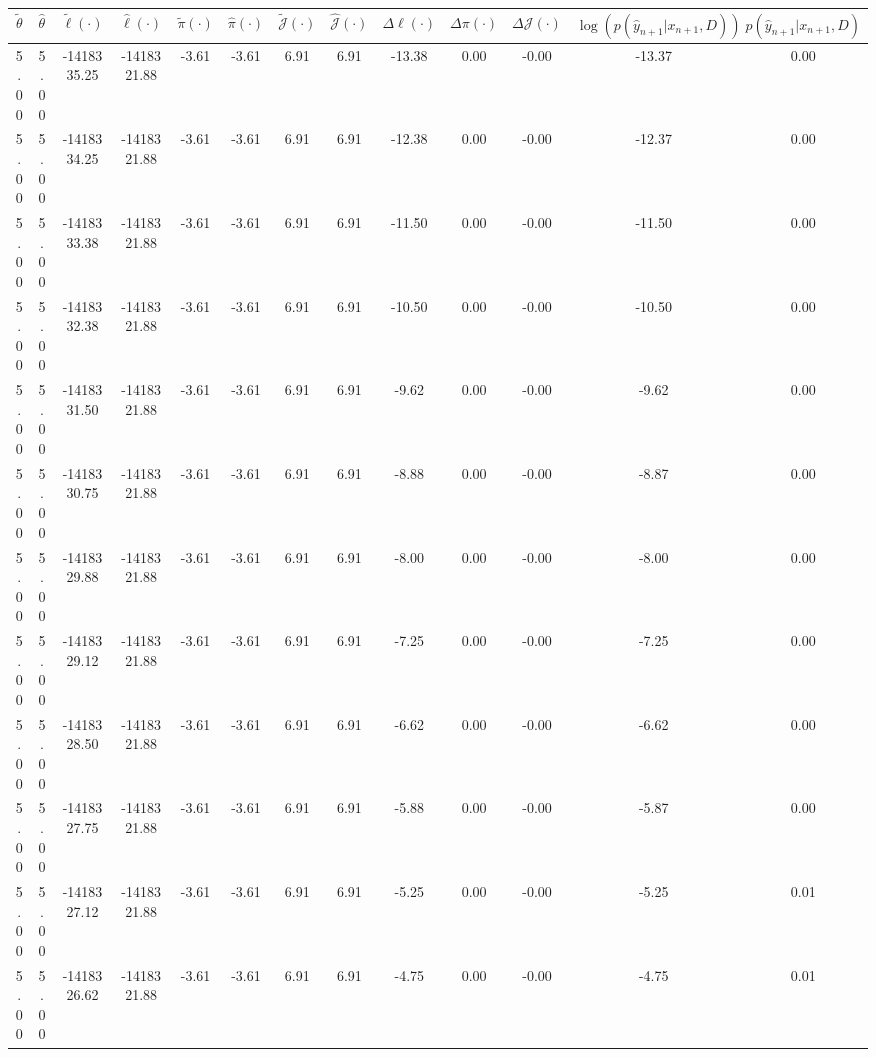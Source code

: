 \begin{table}[htbp]
        \centering
        \tiny
        \begin{adjustbox}{angle=90}
            \begin{tabular}{|c|c|c|c|c|c|c|c|c|c|c|c|c|}
                \hline
                 $\tilde{\theta}$ & $\hat{\theta}$ & $\tilde{\ell}(\cdot)$ & $\hat{\ell}(\cdot)$ & $\tilde{\pi}(\cdot)$ & $\hat{\pi}(\cdot)$ & $\tilde{\mathcal{J}}(\cdot)$ & $\hat{\mathcal{J}}(\cdot)$ & $\Delta \ell(\cdot)$ & $\Delta \pi(\cdot)$ & $\Delta \mathcal{J}(\cdot)$ & $\log(p(\hat{y}_{n+1}|x_{n+1}, D))$ & $p(\hat{y}_{n+1}|x_{n+1}, D)$ \\
                \hline
                 5.00 & 5.00 & -1418335.25 & -1418321.88 & -3.61 & -3.61 & 6.91 & 6.91 & -13.38 & 0.00 & -0.00 & -13.37 & 0.00\\ \hline
 5.00 & 5.00 & -1418334.25 & -1418321.88 & -3.61 & -3.61 & 6.91 & 6.91 & -12.38 & 0.00 & -0.00 & -12.37 & 0.00\\ \hline
 5.00 & 5.00 & -1418333.38 & -1418321.88 & -3.61 & -3.61 & 6.91 & 6.91 & -11.50 & 0.00 & -0.00 & -11.50 & 0.00\\ \hline
 5.00 & 5.00 & -1418332.38 & -1418321.88 & -3.61 & -3.61 & 6.91 & 6.91 & -10.50 & 0.00 & -0.00 & -10.50 & 0.00\\ \hline
 5.00 & 5.00 & -1418331.50 & -1418321.88 & -3.61 & -3.61 & 6.91 & 6.91 & -9.62 & 0.00 & -0.00 & -9.62 & 0.00\\ \hline
 5.00 & 5.00 & -1418330.75 & -1418321.88 & -3.61 & -3.61 & 6.91 & 6.91 & -8.88 & 0.00 & -0.00 & -8.87 & 0.00\\ \hline
 5.00 & 5.00 & -1418329.88 & -1418321.88 & -3.61 & -3.61 & 6.91 & 6.91 & -8.00 & 0.00 & -0.00 & -8.00 & 0.00\\ \hline
 5.00 & 5.00 & -1418329.12 & -1418321.88 & -3.61 & -3.61 & 6.91 & 6.91 & -7.25 & 0.00 & -0.00 & -7.25 & 0.00\\ \hline
 5.00 & 5.00 & -1418328.50 & -1418321.88 & -3.61 & -3.61 & 6.91 & 6.91 & -6.62 & 0.00 & -0.00 & -6.62 & 0.00\\ \hline
 5.00 & 5.00 & -1418327.75 & -1418321.88 & -3.61 & -3.61 & 6.91 & 6.91 & -5.88 & 0.00 & -0.00 & -5.87 & 0.00\\ \hline
 5.00 & 5.00 & -1418327.12 & -1418321.88 & -3.61 & -3.61 & 6.91 & 6.91 & -5.25 & 0.00 & -0.00 & -5.25 & 0.01\\ \hline
 5.00 & 5.00 & -1418326.62 & -1418321.88 & -3.61 & -3.61 & 6.91 & 6.91 & -4.75 & 0.00 & -0.00 & -4.75 & 0.01\\ \hline

\end{tabular}
\end{adjustbox}
\end{table}
